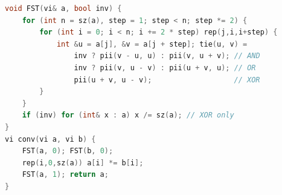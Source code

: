 \begin{multicols}{\Columns}
\begin{lstlisting}[language=C++]
void FST(vi& a, bool inv) {
	for (int n = sz(a), step = 1; step < n; step *= 2) {
		for (int i = 0; i < n; i += 2 * step) rep(j,i,i+step) {
			int &u = a[j], &v = a[j + step]; tie(u, v) =
				inv ? pii(v - u, u) : pii(v, u + v); // AND
				inv ? pii(v, u - v) : pii(u + v, u); // OR
				pii(u + v, u - v);                   // XOR
		}
	}
	if (inv) for (int& x : a) x /= sz(a); // XOR only
}
vi conv(vi a, vi b) {
	FST(a, 0); FST(b, 0);
	rep(i,0,sz(a)) a[i] *= b[i];
	FST(a, 1); return a;
}
\end{lstlisting}



\end{multicols}
